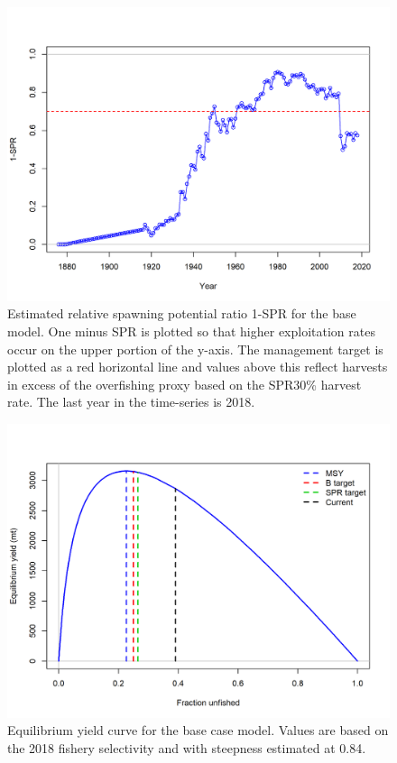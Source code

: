 \documentclass[12pt,]{article}
\begin{document}
\FloatBarrier  

\begin{figure}
\centering
\includegraphics{r4ss/plots_mod1/SPR2_minusSPRseries.png}
\caption{Estimated relative spawning potential ratio 1-SPR for the base
model. One minus SPR is plotted so that higher exploitation rates occur
on the upper portion of the y-axis. The management target is plotted as
a red horizontal line and values above this reflect harvests in excess
of the overfishing proxy based on the SPR30\% harvest rate. The last
year in the time-series is 2018. \label{fig:SPR_all_fig}}
\end{figure}

\FloatBarrier

\begin{figure}
\centering
\includegraphics{r4ss/plots_mod1/yield2_yield_curve_with_refpoints.png}
\caption{Equilibrium yield curve for the base case model. Values are
based on the 2018 fishery selectivity and with steepness estimated at
0.84. \label{fig:yield}}
\end{figure}
\end{document}
